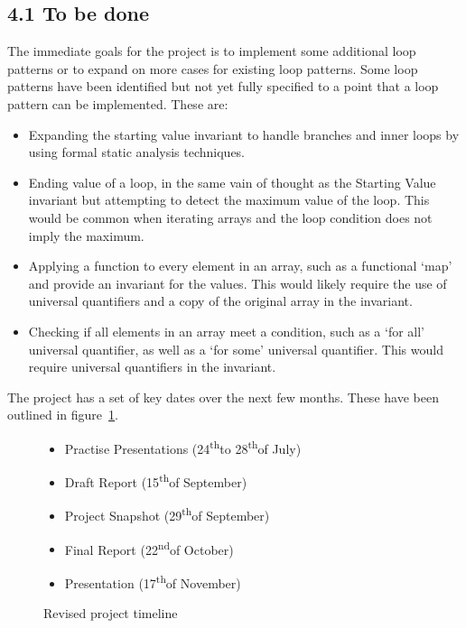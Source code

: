 \documentclass[11pt, a4paper, twoside, openright]{report}
\newcommand{\snd}{\textsuperscript{nd}}
\newcommand{\sth}{\textsuperscript{th}}
\begin{document}
\subsection*{4.1 To be done}

The immediate goals for the project is to implement some additional loop
patterns or to expand on more cases for existing loop patterns.
Some loop patterns have been identified but not yet
fully specified to a point that a loop pattern can be implemented.
These are:
\begin{itemize}
    \item Expanding the starting value invariant to handle branches
        and inner loops by using formal static analysis techniques.
    \item Ending value of a loop, in the same vain of thought as the Starting
        Value invariant but attempting to detect the maximum value of the loop.
        This would be common when iterating arrays and the loop condition does
        not imply the maximum.
    \item Applying a function to every element in an array, such as a
        functional `map' and provide an invariant for the values.
        This would likely require the use of universal quantifiers
        and a copy of the original array in the invariant.
    \item Checking if all elements in an array meet a condition, such as
        a `for all' universal quantifier, as well as a `for some' universal
        quantifier.
        This would require universal quantifiers in the invariant.
\end{itemize}

The project has a set of key dates over the next few months.
These have been outlined in figure~\ref{list:timeline}.

\begin{figure}[ht]
    \begin{itemize}
        \item Practise Presentations (24\sth to 28\sth of July)
        \item Draft Report (15\sth of September)
        \item Project Snapshot (29\sth of September)
        \item Final Report (22\snd of October)
        \item Presentation (17\sth of November)
    \end{itemize}
    \caption{Revised project timeline}\label{list:timeline}
\end{figure}
\end{document}
